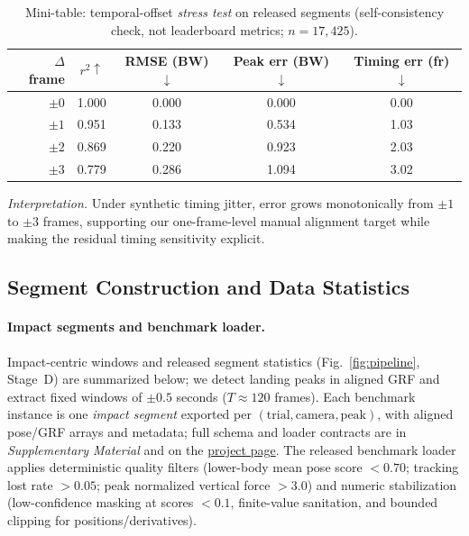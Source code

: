 \documentclass[sigconf,screen]{acmart}
\newcommand{\BadmintonGRFGitHubBase}{https://github.com/KenyaNiu/BadmintonGRF}
\newcommand{\BadmintonGRFRepoShort}{\href{\BadmintonGRFGitHubBase}{project page}}
\newcommand{\BadmintonGRFSupplementary}{\emph{Supplementary Material}}
\begin{document}
\begin{table}[t]
  \centering
  \small
  \setlength{\tabcolsep}{4pt}
  \renewcommand{\arraystretch}{1.05}
  \caption{Mini-table: temporal-offset \emph{stress test} on released segments (self-consistency check, not leaderboard metrics; $n=17{,}425$).}
  \label{tab:sync_sensitivity}
  \begin{tabular}{@{}rcccc@{}}
    \toprule
    $\Delta$ frame & $r^2\uparrow$ & RMSE (BW)$\downarrow$ & Peak err (BW)$\downarrow$ & Timing err (fr)$\downarrow$ \\
    \midrule
    $\pm 0$ & 1.000 & 0.000 & 0.000 & 0.00 \\
    $\pm 1$ & 0.951 & 0.133 & 0.534 & 1.03 \\
    $\pm 2$ & 0.869 & 0.220 & 0.923 & 2.03 \\
    $\pm 3$ & 0.779 & 0.286 & 1.094 & 3.02 \\
    \bottomrule
  \end{tabular}
\end{table}
\noindent\emph{Interpretation.} Under synthetic timing jitter, error grows monotonically from $\pm1$ to $\pm3$ frames, supporting our one-frame-level manual alignment target while making the residual timing sensitivity explicit.

\subsection{Segment Construction and Data Statistics}
\label{sec:dataset_stats}
\paragraph{Impact segments and benchmark loader.}
Impact-centric windows and released segment statistics (Fig.~\ref{fig:pipeline}, Stage~D) are summarized below; we detect landing peaks in aligned GRF and extract fixed windows of \(\pm 0.5\) seconds (\(T \approx 120\) frames).
Each benchmark instance is one \emph{impact segment} exported per \((\text{trial},\text{camera},\text{peak})\), with aligned pose/GRF arrays and metadata; full schema and loader contracts are in \BadmintonGRFSupplementary{} and on the \BadmintonGRFRepoShort.
The released benchmark loader applies deterministic quality filters (lower-body mean pose score $<0.70$; tracking lost rate $>0.05$; peak normalized vertical force $>3.0$) and numeric stabilization (low-confidence masking at scores $<0.1$, finite-value sanitation, and bounded clipping for positions/derivatives).
\end{document}
